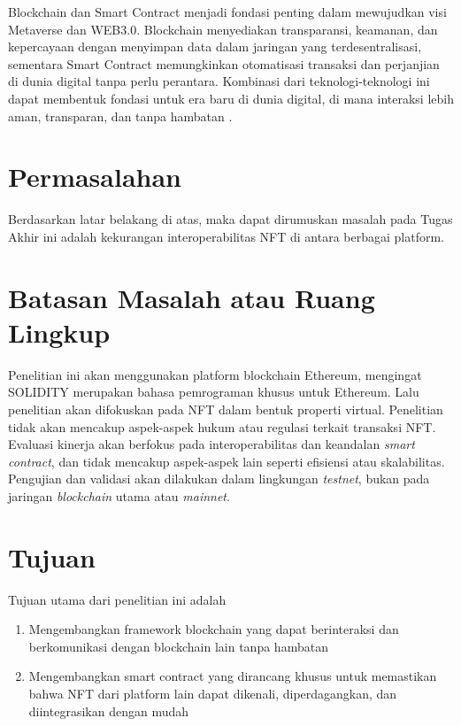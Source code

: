 Blockchain dan Smart Contract menjadi fondasi penting dalam mewujudkan visi Metaverse dan WEB3.0. Blockchain menyediakan transparansi, keamanan, dan kepercayaan dengan menyimpan data dalam jaringan yang terdesentralisasi, sementara Smart Contract memungkinkan otomatisasi transaksi dan perjanjian di dunia digital tanpa perlu perantara. Kombinasi dari teknologi-teknologi ini dapat membentuk fondasi untuk era baru di dunia digital, di mana interaksi lebih aman, transparan, dan tanpa hambatan \parencite{Gadekallu2022}.

\lipsum[2]

\section{Permasalahan}
\label{sec:permasalahan}

Berdasarkan latar belakang di atas, maka dapat dirumuskan masalah pada Tugas Akhir ini adalah kekurangan interoperabilitas NFT di antara berbagai platform.

\section{Batasan Masalah atau Ruang Lingkup}
Penelitian ini akan menggunakan platform blockchain Ethereum, mengingat SOLIDITY merupakan bahasa pemrograman khusus untuk Ethereum. Lalu penelitian akan difokuskan pada NFT dalam bentuk properti virtual. Penelitian tidak akan mencakup aspek-aspek hukum atau regulasi terkait transaksi NFT. Evaluasi kinerja akan berfokus pada interoperabilitas dan keandalan \emph{smart contract}, dan tidak mencakup aspek-aspek lain seperti efisiensi atau skalabilitas. Pengujian dan validasi akan dilakukan dalam lingkungan \emph{testnet}, bukan pada jaringan \emph{blockchain} utama atau \emph{mainnet}.

\section{Tujuan}
\label{sec:Tujuan}

Tujuan utama dari penelitian ini adalah 

\begin{enumerate}[nolistsep]

  \item Mengembangkan framework blockchain yang dapat berinteraksi dan berkomunikasi dengan blockchain lain tanpa hambatan

  \item Mengembangkan smart contract yang dirancang khusus untuk memastikan bahwa NFT dari platform lain dapat dikenali, diperdagangkan, dan diintegrasikan dengan mudah

\end{enumerate}

